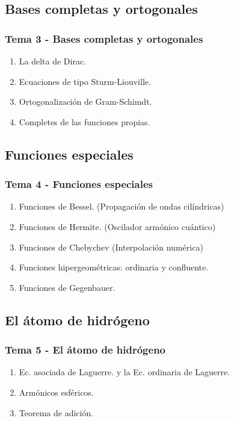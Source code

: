 \documentclass[12pt]{beamer}
\begin{document}
\subsection{Bases completas y ortogonales}

\begin{frame}
\frametitle{Tema 3 - Bases completas y ortogonales}
\begin{enumerate}[<+->]
\item La delta de Dirac. 
\item Ecuaciones de tipo Sturm-Liouville.
\item Ortogonalización de Gram-Schimdt.
\item Completes de las funciones propias.
\end{enumerate}
\end{frame}

\subsection{Funciones especiales}

\begin{frame}
\frametitle{Tema 4 - Funciones especiales}
\begin{enumerate}[<+->]
\item Funciones de Bessel. (Propagación de ondas cilíndricas)
\item Funciones de Hermite. (Oscilador armónico cuántico)
\item Funciones de Chebychev (Interpolación numérica)
\item Funciones hipergeométricas: ordinaria y confluente.
\item Funciones de Gegenbauer.
\end{enumerate}
\end{frame}

\subsection{El átomo de hidrógeno}

\begin{frame}
\frametitle{Tema 5 - El átomo de hidrógeno}
\begin{enumerate}[<+->]
\item Ec. asociada de Laguerre. y la Ec. ordinaria de Laguerre.
\item Armónicos esféricos.
\item Teorema de adición.
\end{enumerate}
\end{frame}
\end{document}
